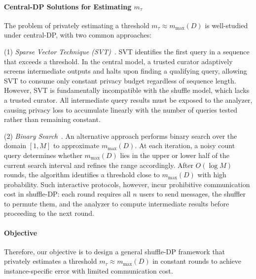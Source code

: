 \paragraph{Central-DP Solutions for Estimating $m_\tau$}

The problem of privately estimating a threshold $m_\tau \approx m_{\max}(D)$ is well-studied under central-DP, with two common approaches:


(1) \textit{Sparse Vector Technique (SVT)}~\cite{dwork2009complexity}. SVT identifies the first query in a sequence that exceeds a threshold. 
In the central model, a trusted curator adaptively screens intermediate outputs and halts upon finding a qualifying query, allowing SVT to consume only constant privacy budget regardless of sequence length. 
However, SVT is fundamentally incompatible with the shuffle model, which lacks a trusted curator. 
All intermediate query results must be exposed to the analyzer, causing privacy loss to accumulate linearly with the number of queries tested rather than remaining constant.


(2) \textit{Binary Search}~\cite{gilbert2002summarize, cormode2005improved}. 
An alternative approach performs binary search over the domain $[1, M]$ to approximate $m_{\max}(D)$. 
At each iteration, a noisy count query determines whether $m_{\max}(D)$ lies in the upper or lower half of the current search interval and refines the range accordingly. 
After $O(\log M)$ rounds, the algorithm identifies a threshold close to $m_{\max}(D)$ with high probability.
Such interactive protocols, however, incur prohibitive communication cost in shuffle-DP: each round requires all $n$ users to send messages, the shuffler to permute them, and the analyzer to compute intermediate results before proceeding to the next round.




\paragraph{Objective}
Therefore, our objective is to design a general shuffle-DP framework that privately estimates a threshold $m_\tau \approx m_{\max}(D)$ in constant rounds to achieve instance-specific error with limited communication cost.